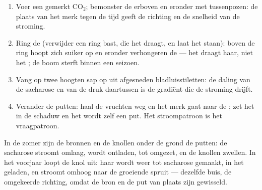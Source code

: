 \begin{method}\label{met:b1:plant-transport:translocation}
\begin{enumerate}
  \item Voer een  gemerkt $\mathrm{CO_2}$; bemonster de 
        erboven en eronder met tussenpozen: de plaats van het merk tegen
        de tijd geeft de richting en de snelheid van de stroming.
  \item Ring de  (verwijder een ring bast, die het  draagt,
        en laat het  staan): boven de ring hoopt zich suiker op en
        eronder verhongeren de  --- het  draagt haar, niet
        het ; de boom sterft binnen een seizoen.
  \item Vang op twee hoogten sap op uit afgesneden bladluisstiletten: de
        daling van de sacharose en van de druk daartussen is de gradiënt
        die de stroming drijft.
  \item Verander de putten: haal de vruchten weg en het merk gaat naar de
        ; zet het  in de schaduw en het wordt zelf een put. Het
        stroompatroon is het vraagpatroon.
\end{enumerate}
\end{method}

\begin{example}\label{ex:b1:plant-transport:potato}
In de zomer zijn de  bronnen en de knollen onder de grond de
putten: de sacharose stroomt omlaag, wordt ontladen, tot  omgezet, en
de knollen zwellen. In het voorjaar loopt de knol uit: haar  wordt
weer tot sacharose gemaakt, in het  geladen, en stroomt omhoog naar de
groeiende spruit --- dezelfde buis, de omgekeerde richting, omdat de bron en
de put van plaats zijn gewisseld.
\end{example}

